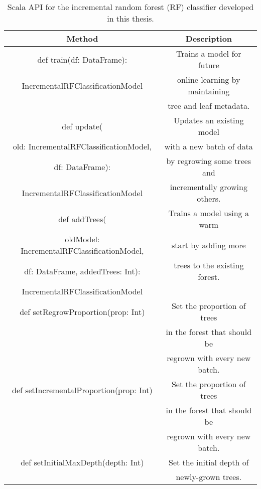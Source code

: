 \begin{table}
  \centering
  \begin{tabular}{ | c | c | }
  \hline
  \textbf{Method} & \textbf{Description} \\
  \hline
  def train(df: DataFrame): & Trains a model for future \\
  IncrementalRFClassificationModel &  online learning by maintaining \\
  & tree and leaf metadata. \\ 
  \hline
  def update( & Updates an existing model \\
  old: IncrementalRFClassificationModel, & with a new batch of data \\
  df: DataFrame): & by regrowing some trees and \\
  IncrementalRFClassificationModel & incrementally growing others. \\
  \hline
  def addTrees( & Trains a model using a warm \\
  oldModel: IncrementalRFClassificationModel, & start by adding more \\
  df: DataFrame, addedTrees: Int): & trees to the existing forest. \\
  IncrementalRFClassificationModel & \\ 
  \hline
  def setRegrowProportion(prop: Int) & Set the proportion of trees \\
  & in the forest that should be \\
  & regrown with every new batch. \\
  \hline
  def setIncrementalProportion(prop: Int) & Set the proportion of trees \\
  & in the forest that should be \\
  & regrown with every new batch. \\
  \hline
  def setInitialMaxDepth(depth: Int) & Set the initial depth of \\
  & newly-grown trees. \\
  \hline
  \end{tabular}
  \caption{Scala API for the incremental random forest (RF) classifier developed in this thesis.}
  \label{tab:api}
\end{table}
